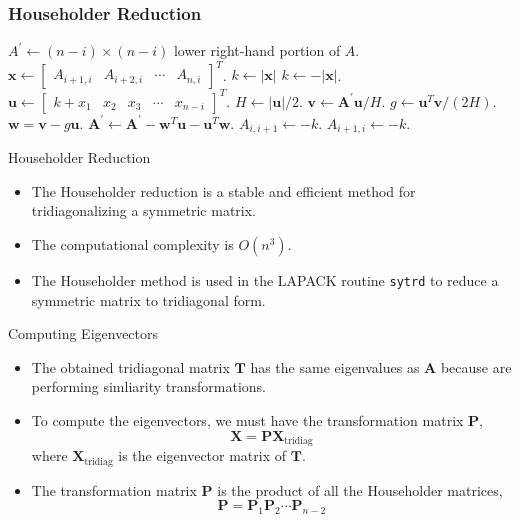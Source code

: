 \documentclass{beamer}
\begin{document}
\begin{frame}[fragile]
\frametitle{Householder Reduction}
 
  \begin{algorithm}[H]
    \caption{Householder Reduction}
    \scriptsize
    \begin{algorithmic}
            \State  $A^{\prime} \gets (n-i) \times (n-i)$ lower right-hand portion of $A$.
            \State  $\mathbf{x} \gets \left[\begin{array}{llll}A_{i+1, i} & A_{i+2, i} & \cdots & A_{n, i}\end{array}\right]^T$.
            \State $k \gets |\mathbf{x}|$ 
            \State $k\gets-|\mathbf{x}|$.
            \EndIf
            \State $\mathbf{u}\gets \left[\begin{array}{lllll}k+x_1 & x_2 & x_3 & \cdots & x_{n-i}\end{array}\right]^T$.
            \State  $H\gets|\mathbf{u}| / 2$.
            \State  $\mathbf{v}\gets\mathbf{A}^{\prime} \mathbf{u} / H$.
            \State $g\gets\mathbf{u}^T \mathbf{v} / (2 H)$.
            \State  $\mathbf{w}=\mathbf{v}-g\mathbf{u}$.
            \State $\mathbf{A}^{\prime} \gets \mathbf{A}^{\prime}-\mathbf{w}^T \mathbf{u}-\mathbf{u}^T \mathbf{w}$.
            \State  $A_{i, i+1}\gets -k$.
            \State  $A_{i+1, i}\gets -k$.
        \EndFor
    \end{algorithmic}
\end{algorithm}
\end{frame}
\begin{frame}{Householder Reduction}
    \begin{itemize}
        \item The Householder reduction is a stable and efficient method for tridiagonalizing a symmetric matrix.
        \item The computational complexity is $O(n^3)$.
        \item The Householder method is used in the LAPACK routine \texttt{sytrd} to reduce a symmetric matrix to tridiagonal form.
    \end{itemize}
\end{frame}
\begin{frame}{Computing Eigenvectors}
    \begin{itemize}
        \item The obtained tridiagonal matrix $\mathbf{T}$ has the same eigenvalues as $\mathbf{A}$ because 
        are performing simliarity transformations.  
        \item To compute the eigenvectors, we must have the transformation matrix $\mathbf{P}$,
        \[\mathbf{X}=\mathbf{P} \mathbf{X}_{\mathrm {tridiag }}
        \]
        where $\mathbf{X}_{\mathrm {tridiag }}$ is the eigenvector matrix of $\mathbf{T}$.
        \item The transformation matrix $\mathbf{P}$ is the product of all the Householder matrices,
        \[
            \mathbf{P}=\mathbf{P}_1 \mathbf{P}_2 \cdots \mathbf{P}_{n-2}
        \]
    \end{itemize}
\end{frame}
\end{document}
